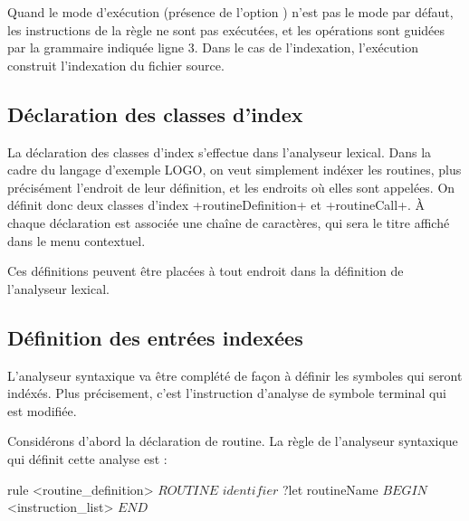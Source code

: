 Quand le mode d'exécution (présence de l'option ) n'est pas le mode par défaut, les instructions de la règle ne sont pas exécutées, et les opérations sont guidées par la grammaire indiquée ligne 3. Dans le cas de l'indexation, l'exécution construit l'indexation du fichier source.









\subsection{Déclaration des classes d'index}

La déclaration des classes d'index s'effectue dans l'analyseur lexical. Dans la cadre du langage d'exemple LOGO, on veut simplement indéxer les routines, plus précisément l'endroit de leur définition, et les endroits où elles sont appelées. On définit donc deux classes d'index \ggs+routineDefinition+ et \ggs+routineCall+. À chaque déclaration est associée une chaîne de caractères, qui sera le titre affiché dans le menu contextuel. 


\begin{galgas}
lexique logo_lexique indexing in "INDEXING" {
  ...
indexing routineDefinition : "Routine Definition"
  ...
indexing routineCall : "Routine call"
  ...
\end{galgas}


Ces définitions peuvent être placées à tout endroit dans la définition de l'analyseur lexical.








\subsection{Définition des entrées indexées}

L'analyseur syntaxique va être complété de façon à définir les symboles qui seront indéxés. Plus précisement, c'est l'instruction d'analyse de symbole terminal qui est modifiée.

Considérons d'abord la déclaration de routine. La règle de l'analyseur syntaxique qui définit cette analyse est :

\begin{galgas}
rule <routine_definition> {
  $ROUTINE$
  $identifier$ ?let routineName
  $BEGIN$
  <instruction_list>
  $END$
}
\end{galgas}

